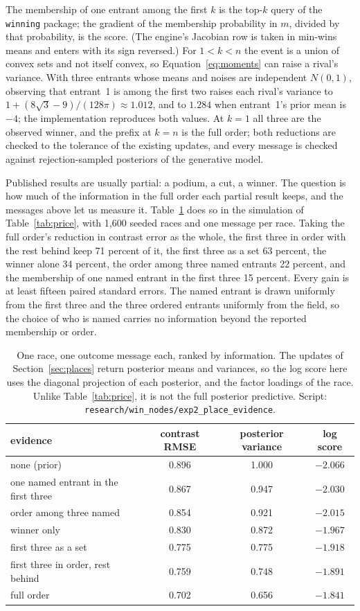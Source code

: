 \documentclass[11pt]{article}
\begin{document}
The membership of one entrant among the first $k$ is the top-$k$
query of the \texttt{winning} package; the gradient of the membership probability in
$m$, divided by that probability, is the score. (The engine's Jacobian
row is taken in min-wins means and enters with its sign reversed.)
For $1<k<n$ the event is a union of convex sets and not itself
convex, so Equation~\eqref{eq:moments} can raise a rival's variance.
With three entrants whose means and noises are independent $N(0,1)$,
observing that entrant~1 is among the first two raises each rival's
variance to $1+(8\sqrt3-9)/(128\pi)\approx1.012$, and to $1.284$ when
entrant~1's prior mean is $-4$; the implementation reproduces both
values. At $k=1$ all
three are the observed winner, and the prefix at $k=n$ is the full
order; both reductions are checked to the tolerance of the existing
updates, and every message is checked against rejection-sampled
posteriors of the generative model.

Published results are usually partial: a podium, a cut, a winner.
The question is how much of the information in the full order each
partial result keeps, and the messages above let us measure it.
Table~\ref{tab:places} does so in the simulation of
Table~\ref{tab:price}, with 1{,}600 seeded races and one message per
race. Taking the full order's reduction in contrast error as the
whole, the first three in order with the rest behind keep
71 percent of it, the first three as a set
63 percent, the winner alone 34 percent, the order among
three named entrants 22 percent, and the membership of one
named entrant in the first three 15 percent. Every gain is at
least fifteen paired standard errors. The named entrant is drawn
uniformly from the first three and the three ordered entrants
uniformly from the field, so the choice of who is named carries no
information beyond the reported membership or order.
\begin{table}[t]
\centering
\begin{tabular}{lccc}
\toprule
evidence & contrast RMSE & posterior variance & log score \\
\midrule
none (prior) & 0.896 & 1.000 & $-2.066$ \\
one named entrant in the first three & 0.867 & 0.947 & $-2.030$ \\
order among three named & 0.854 & 0.921 & $-2.015$ \\
winner only & 0.830 & 0.872 & $-1.967$ \\
first three as a set & 0.775 & 0.775 & $-1.918$ \\
first three in order, rest behind & 0.759 & 0.748 & $-1.891$ \\
full order & 0.702 & 0.656 & $-1.841$ \\
\bottomrule
\end{tabular}
\caption{One race, one outcome message each, ranked by information.
The updates of Section~\ref{sec:places} return posterior means and
variances, so the log score here uses the diagonal projection of each
posterior, and the factor loadings of the race. Unlike
Table~\ref{tab:price}, it is not the full posterior predictive.
Script: \texttt{research/win\_nodes/exp2\_place\_evidence}.}
\label{tab:places}
\end{table}
\end{document}
